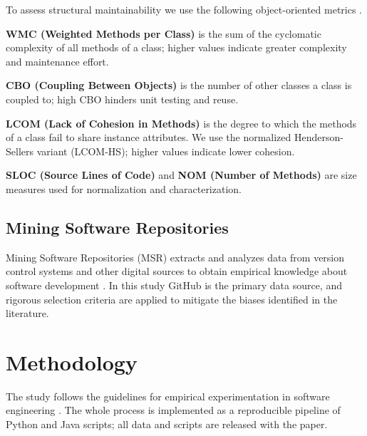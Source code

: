 \documentclass[conference]{IEEEtran}
\begin{document}
To assess structural maintainability we use the following object-oriented
metrics \cite{ChidamberKemerer:1994,HendersonSellers:1996,Filo:2024}.

\textbf{WMC (Weighted Methods per Class)} is the sum of the cyclomatic complexity
of all methods of a class; higher values indicate greater complexity and
maintenance effort.

\textbf{CBO (Coupling Between Objects)} is the number of other classes a class is
coupled to; high CBO hinders unit testing and reuse.

\textbf{LCOM (Lack of Cohesion in Methods)} is the degree to which the methods of
a class fail to share instance attributes. We use the normalized
Henderson-Sellers variant (LCOM-HS); higher values indicate lower cohesion.

\textbf{SLOC (Source Lines of Code)} and \textbf{NOM (Number of Methods)} are
size measures used for normalization and characterization.

\subsection{Mining Software Repositories}

Mining Software Repositories (MSR) extracts and analyzes data from version
control systems and other digital sources to obtain empirical knowledge about
software development \cite{Kalliamvakou:2014}. In this study GitHub is the
primary data source, and rigorous selection criteria are applied to mitigate the
biases identified in the literature.

\section{Methodology} \label{sec:Method}

The study follows the guidelines for empirical experimentation in software
engineering \cite{Wohlin:2012}. The whole process is implemented as a
reproducible pipeline of Python and Java scripts; all data and scripts are
released with the paper.
\end{document}
